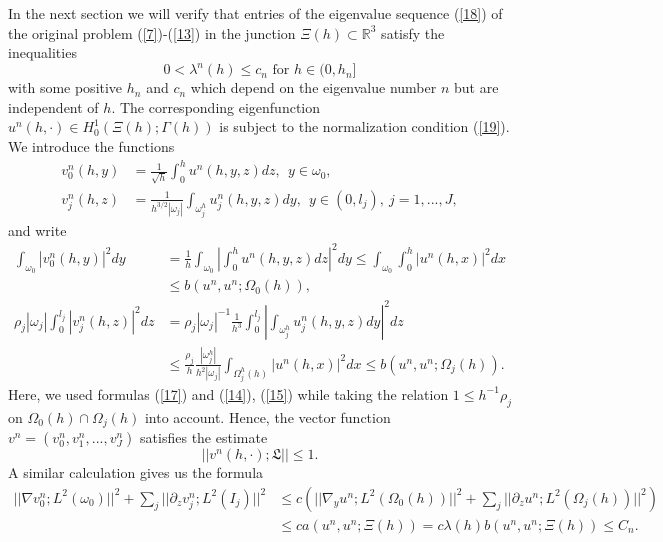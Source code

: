 \documentclass[11pt]{article}%
\numberwithin{equation}{section}
\begin{document}
In the next section we will verify that entries of the eigenvalue sequence
(\ref{18}) of the original problem (\ref{7})-(\ref{13}) in the junction
$\Xi(h)\subset\mathbb{R}^{3}$ satisfy the inequalities%
\begin{equation}
0<\lambda^{n}(h)\leq c_{n}\text{ for }h\in(0,h_{n}] \label{R1}%
\end{equation}
with some positive $h_{n}$ and $c_{n}$ which depend on the eigenvalue number
$n$ but are independent of $h$. The corresponding eigenfunction $u^{n}%
(h,\cdot)\in H_{0}^{1}(\Xi(h);\Gamma(h))$ is subject to the normalization
condition (\ref{19}). We introduce the functions%
\begin{align}
v_{0}^{n}(h,y)  &  =\frac{1}{\sqrt{h}}\int_{0}^{h}u^{n}(h,y,z)dz,\ \ y\in
\omega_{0},\label{R2}\\
v_{j}^{n}(h,z)  &  =\frac{1}{h^{3/2}|\omega_{j}|}\int_{\omega_{j}^{h}}%
u_{j}^{n}(h,y,z)dy,\ \ y\in(0,l_{j}),\ j=1,...,J, \label{R3}%
\end{align}
and write%
\begin{align}
\int_{\omega_{0}}|v_{0}^{n}(h,y)|^{2}dy  &  =\frac{1}{h}\int_{\omega_{0}%
}\left\vert \int_{0}^{h}u^{n}(h,y,z)dz\right\vert ^{2}dy\leq\int_{\omega_{0}%
}\int_{0}^{h}\left\vert u^{n}(h,x)\right\vert ^{2}dx\label{R4}\\
&  \leq b(u^{n},u^{n};\Omega_{0}(h)),\nonumber\\
\rho_{j}|\omega_{j}|\int_{0}^{l_{j}}|v_{j}^{n}(h,z)|^{2}dz  &  =\rho
_{j}|\omega_{j}|^{-1}\frac{1}{h^{3}}\int_{0}^{l_{j}}\left\vert \int
_{\omega_{j}^{h}}u_{j}^{n}(h,y,z)dy\right\vert ^{2}dz\nonumber\\
&  \leq\frac{\rho_{j}}{h}\frac{|\omega_{j}^{h}|}{h^{2}|\omega_{j}|}%
\int_{\Omega_{j}^{h}(h)}|u^{n}(h,x)|^{2}dx\leq b(u^{n},u^{n};\Omega
_{j}(h)).\nonumber
\end{align}
Here, we used formulas (\ref{17}) and (\ref{14}), (\ref{15}) while taking the
relation $1\leq h^{-1}\rho_{j}$ on $\Omega_{0}(h)\cap\Omega_{j}(h)$ into
account. Hence, the vector function $v^{n}=(v_{0}^{n},v_{1}^{n},...,v_{J}%
^{n})$ satisfies the estimate%
\begin{equation}
||v^{n}(h,\cdot);\mathfrak{L}||\leq1. \label{R5}%
\end{equation}
A similar calculation gives us the formula%
\begin{align*}
||\nabla v_{0}^{n};L^{2}(\omega_{0})||^{2}+%
{\textstyle\sum\nolimits_{j}}
||\partial_{z}v_{j}^{n};L^{2}(I_{j})||^{2}  &  \leq c(||\nabla_{y}u^{n}%
;L^{2}(\Omega_{0}(h))||^{2}+%
{\textstyle\sum\nolimits_{j}}
||\partial_{z}u^{n};L^{2}(\Omega_{j}(h))||^{2})\\
&  \leq ca(u^{n},u^{n};\Xi(h))=c\lambda(h)b(u^{n},u^{n};\Xi(h))\leq C_{n}.
\end{align*}
\end{document}
